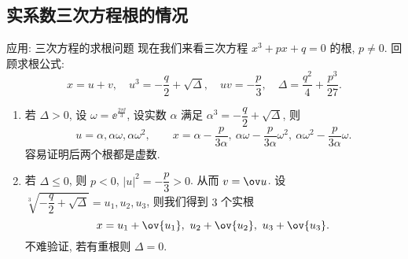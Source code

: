 \subsection{实系数三次方程根的情况}


\begin{frame}{应用: 三次方程的求根问题\noexer}
	\onslide<+->
	现在我们来看三次方程 $x^3+px+q=0$ 的根, $p\neq 0$.
	\onslide<+->
	回顾求根公式:
	\[
		x=u+v,\quad
		u^3=-\frac q2+\sqrt{\Delta},\quad
		uv=-\frac p3,\quad
		\Delta=\frac{q^2}4+\frac{p^3}{27}.
	\]
	\bigdel
	\begin{enumerate}
		\item 若 $\Delta>0$, 设 $\omega=\ee^{\frac{2\pi\ii}3}$, 设实数 $\alpha$ 满足 $\alpha^3=-\dfrac q2+\sqrt{\Delta}$,
		\onslide<+->
		则
		\[
			u=\alpha,\alpha\omega,\alpha\omega^2,\qquad
			x=\alpha-\frac p{3\alpha},\ 
				\alpha\omega-\frac p{3\alpha} \omega^2,\ 
				\alpha\omega^2-\frac p{3\alpha} \omega.
		\]
		\onslide<+->
		容易证明后两个根都是虚数.
		\item 若 $\Delta\le 0$, 则 $p<0$, $|u|^2=-\dfrac p3>0$. 
		\onslide<+->
		从而 $v=\ov u$.
		\onslide<+->
		设 $\sqrt[3]{-\dfrac q2+\sqrt{\Delta}}=u_1,u_2,u_3$,
		\onslide<+->
		则我们得到 $3$ 个实根
		\[
			x=u_1+\ov{u_1},\ u_2+\ov{u_2},\ u_3+\ov{u_3}.
		\]
		\onslide<+->
		不难验证, 若有重根则 $\Delta=0$.
	\end{enumerate}
\end{frame}

